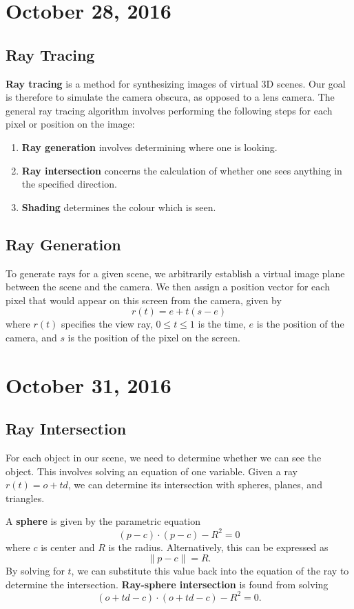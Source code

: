 \documentclass[11pt]{article}
\theoremstyle{plain} %
\theoremstyle{definition}
\theoremstyle{example}
\theoremstyle{remark}
\begin{document}
\section{October 28, 2016}
\subsection{Ray Tracing}

\textbf{Ray tracing} is a method for synthesizing images of virtual 3D scenes. Our goal is therefore to simulate the camera obscura, as opposed to a lens camera. The general ray tracing algorithm involves performing the following steps for each pixel or position on the image:
\begin{enumerate}
	\item \textbf{Ray generation} involves determining where one is looking.
	\item \textbf{Ray intersection} concerns the calculation of whether one sees anything in the specified direction.
	\item \textbf{Shading} determines the colour which is seen. 
\end{enumerate}

\subsection{Ray Generation}

To generate rays for a given scene, we arbitrarily establish a virtual image plane between the scene and the camera. We then assign a position vector for each pixel that would appear on this screen from the camera, given by 
$$r(t) = e+t(s-e)$$
where $r(t)$ specifies the view ray, $0\leq t\leq1$ is the time, $e$ is the position of the camera, and $s$ is the position of the pixel on the screen.
	
\section{October 31, 2016}
\subsection{Ray Intersection}

For each object in our scene, we need to determine whether we can see the object. This involves solving an equation of one variable. Given a ray $r(t) = o+td$, we can determine its intersection with spheres, planes, and triangles.

A \textbf{sphere} is given by the parametric equation 
$$(p-c) \cdot (p-c) - R^2 = 0$$ 
where $c$ is center and $R$ is the radius. Alternatively, this can be expressed as 
$$\|p-c\|=R.$$ By solving for $t$, we can substitute this value back into the equation of the ray to determine the intersection. \textbf{Ray-sphere intersection} is found from solving
$$(o + td - c) \cdot (o + td - c) -R^2 = 0.$$
\end{document}
